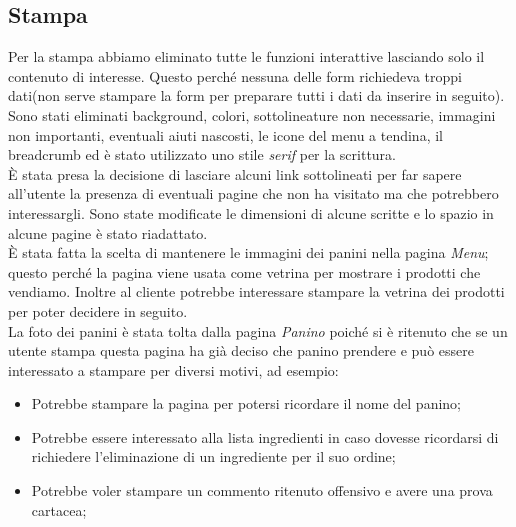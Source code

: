 \subsection{Stampa}
Per la stampa abbiamo eliminato tutte le funzioni interattive lasciando solo il contenuto di interesse.
Questo perché nessuna delle form richiedeva troppi dati(non serve stampare la form per preparare tutti i dati da inserire in seguito).\\
Sono stati eliminati background, colori, sottolineature non necessarie, immagini non importanti, eventuali aiuti nascosti, le icone del menu a tendina, il breadcrumb ed è stato utilizzato uno stile \emph{serif} per la scrittura.\\
È stata presa la decisione di lasciare alcuni link sottolineati per far sapere all'utente la presenza di eventuali pagine che non ha visitato ma che potrebbero interessargli. %
Sono state modificate le dimensioni di alcune scritte e lo spazio in alcune pagine è stato riadattato.\\
È stata fatta la scelta di mantenere le immagini dei panini nella pagina \emph{Menu}; 
questo perché la pagina viene usata come vetrina per mostrare i prodotti che vendiamo.
Inoltre al cliente potrebbe interessare stampare la vetrina dei prodotti per poter decidere in seguito.\\
La foto dei panini è stata tolta dalla pagina \emph{Panino} poiché si è ritenuto che se un utente stampa questa pagina ha già deciso che panino prendere e può essere interessato a stampare per diversi motivi, ad esempio:
\begin{itemize}
	\item Potrebbe stampare la pagina per potersi ricordare il nome del panino;
	\item Potrebbe essere interessato alla lista ingredienti in caso dovesse ricordarsi di richiedere l'eliminazione di un ingrediente per il suo ordine;
	\item Potrebbe voler stampare un commento ritenuto offensivo e avere una prova cartacea;
\end{itemize}